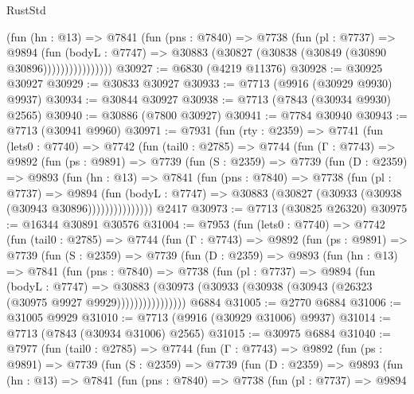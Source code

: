 \begin{lexlean}{RustStd}
\begin{coremodule}
                    (fun (hn : @13) =>
                    @7841
                      (fun (pns : @7840) =>
                      @7738
                        (fun (pl : @7737) =>
                        @9894
                          (fun (bodyL : @7747) =>
                          @30883 (@30827 (@30838 (@30849 (@30890 @30896))))))))))))))))
@30927 := @6830 (@4219 @11376)
@30928 := @30925 @30927
@30929 := @30833 @30927
@30933 := @7713 (@9916 (@30929 @9930) @9937)
@30934 := @30844 @30927
@30938 := @7713 (@7843 (@30934 @9930) @2565)
@30940 := @30886 (@7800 @30927)
@30941 := @7784 @30940
@30943 := @7713 (@30941 @9960)
@30971 := @7931
    (fun (rty : @2359) =>
    @7741
      (fun (lets0 : @7740) =>
      @7742
        (fun (tail0 : @2785) =>
        @7744
          (fun (Γ : @7743) =>
          @9892
            (fun (ps : @9891) =>
            @7739
              (fun (S : @2359) =>
              @7739
                (fun (D : @2359) =>
                @9893
                  (fun (hn : @13) =>
                  @7841
                    (fun (pns : @7840) =>
                    @7738
                      (fun (pl : @7737) =>
                      @9894
                        (fun (bodyL : @7747) =>
                        @30883 (@30827 (@30933 (@30938 (@30943 @30896)))))))))))))))
    @2417
@30973 := @7713 (@30825 @26320)
@30975 := @16344 @30891 @30576
@31004 := @7953
    (fun (lets0 : @7740) =>
    @7742
      (fun (tail0 : @2785) =>
      @7744
        (fun (Γ : @7743) =>
        @9892
          (fun (ps : @9891) =>
          @7739
            (fun (S : @2359) =>
            @7739
              (fun (D : @2359) =>
              @9893
                (fun (hn : @13) =>
                @7841
                  (fun (pns : @7840) =>
                  @7738
                    (fun (pl : @7737) =>
                    @9894
                      (fun (bodyL : @7747) =>
                      @30883
                        (@30973 (@30933 (@30938 (@30943 (@26323 (@30975 @9927 @9929))))))))))))))))
    @6884
@31005 := @2770 @6884
@31006 := @31005 @9929
@31010 := @7713 (@9916 (@30929 @31006) @9937)
@31014 := @7713 (@7843 (@30934 @31006) @2565)
@31015 := @30975 @6884
@31040 := @7977
    (fun (tail0 : @2785) =>
    @7744
      (fun (Γ : @7743) =>
      @9892
        (fun (ps : @9891) =>
        @7739
          (fun (S : @2359) =>
          @7739
            (fun (D : @2359) =>
            @9893
              (fun (hn : @13) =>
              @7841
                (fun (pns : @7840) =>
                @7738
                  (fun (pl : @7737) =>
                  @9894

\end{coremodule}
\end{lexlean}
